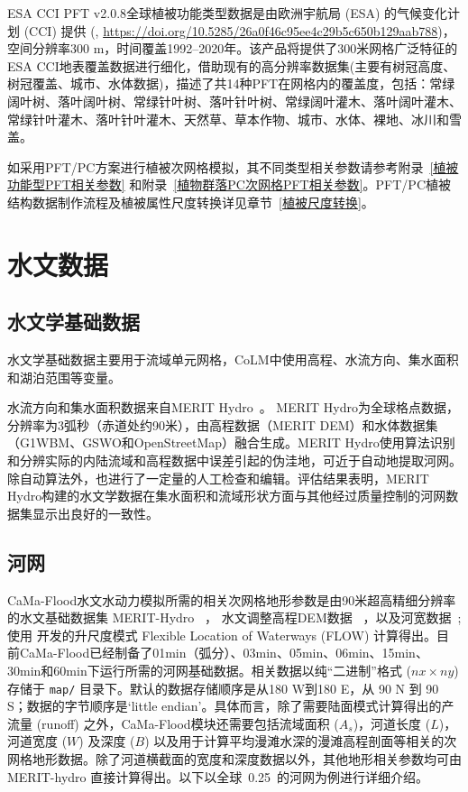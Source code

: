 ESA CCI PFT v2.0.8全球植被功能类型数据是由欧洲宇航局 (ESA) 的气候变化计划 (CCI) 提供  (\citet{harper202329yearTimeSeries}, \url{https://doi.org/10.5285/26a0f46c95ee4c29b5c650b129aab788})，空间分辨率300 m，时间覆盖1992--2020年。该产品将提供了300米网格广泛特征的ESA CCI地表覆盖数据进行细化，借助现有的高分辨率数据集(主要有树冠高度、树冠覆盖、城市、水体数据)，描述了共14种PFT在网格内的覆盖度，包括：常绿阔叶树、落叶阔叶树、常绿针叶树、落叶针叶树、常绿阔叶灌木、落叶阔叶灌木、常绿针叶灌木、落叶针叶灌木、天然草、草本作物、城市、水体、裸地、冰川和雪盖。

如采用PFT/PC方案进行植被次网格模拟，其不同类型相关参数请参考附录~\ref{植被功能型PFT相关参数} 和附录~\ref{植物群落PC次网格PFT相关参数}。PFT/PC植被结构数据制作流程及植被属性尺度转换详见章节~\ref{植被尺度转换}。


\section{水文数据}\label{水文数据}

\subsection{水文学基础数据}
水文学基础数据主要用于流域单元网格，CoLM中使用高程、水流方向、集水面积和湖泊范围等变量。

水流方向和集水面积数据来自MERIT Hydro~\citep{yamazaki2019merit}。 MERIT Hydro为全球格点数据，分辨率为3弧秒（赤道处约90米），由高程数据（MERIT DEM）和水体数据集（G1WBM、GSWO和OpenStreetMap）融合生成。MERIT Hydro使用算法识别和分辨实际的内陆流域和高程数据中误差引起的伪洼地，可近于自动地提取河网。除自动算法外，也进行了一定量的人工检查和编辑。评估结果表明，MERIT Hydro构建的水文学数据在集水面积和流域形状方面与其他经过质量控制的河网数据集显示出良好的一致性。

\subsection{河网}
CaMa-Flood水文水动力模拟所需的相关次网格地形参数是由90米超高精细分辨率的水文基础数据集 MERIT-Hydro ~\citep{yamazaki2019merit}，
水文调整高程DEM数据 ~\citep{yamazaki2017high,yamazaki2012analysis}，以及河宽数据~\citep{yamazaki2014development}; 
使用 \citet{yamazaki2009deriving} 开发的升尺度模式 Flexible Location of Waterways (FLOW) 计算得出。目前CaMa-Flood已经制备了01min（弧分）、03min、05min、06min、15min、30min和60min下运行所需的河网基础数据。相关数据以纯``二进制''格式 ($nx\times ny$)存储于 \texttt{map/} 目录下。默认的数据存储顺序是从180 \textdegree W到180 \textdegree E，从 90 \textdegree N 到 90 \textdegree S；数据的字节顺序是`little endian'。具体而言，除了需要陆面模式计算得出的产流量 (runoff) 之外，CaMa-Flood模块还需要包括流域面积 ($A_s$)，河道长度 ($L$)，河道宽度 ($W$) 及深度 ($B$) 以及用于计算平均漫滩水深的漫滩高程剖面等相关的次网格地形数据。除了河道横截面的宽度和深度数据以外，其他地形相关参数均可由 MERIT-hydro 直接计算得出。以下以全球~0.25\textdegree ~的河网为例进行详细介绍。


